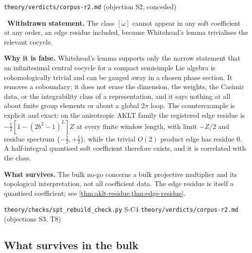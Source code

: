 %
{\texttt{theory/verdicts/corpus-r2.md} (objection S2, conceded)}

\begin{refutedclaim}\label{ref:spt-nogo}
\statusRefuted\ \textbf{Withdrawn statement.} The class $[\omega]$ cannot
appear in any soft coefficient at any order, an edge residue included, because
Whitehead's lemma trivialises the relevant cocycle.

\textbf{Why it is false.} Whitehead's lemma supports only the narrow
statement that an infinitesimal central cocycle for a compact semisimple Lie
algebra is cohomologically trivial and can be gauged away in a chosen phase
section. It removes a coboundary; it does not erase the dimension, the
weights, the Casimir data, or the integrability class of a representation, and
it says nothing at all about finite group elements or about a global
$2\pi$ loop. The counterexample is explicit and exact: on the anisotropic AKLT
family the registered edge residue is $-\tfrac12[1-(2b^{2}-1)^{L}]Z$ at every
finite window length, with limit $-Z/2$ and residue spectrum
$\{-\tfrac12,+\tfrac12\}$, while the trivial $O(2)$ product edge has residue
$0$. A half-integral quantised soft coefficient therefore exists, and it is
correlated with the class.

\textbf{What survives.} The bulk no-go concerns a bulk projective multiplier
and its topological interpretation, not all coefficient data. The edge residue
is itself a quantised coefficient; see \cref{thm:aklt-residue,thm:edge-residue}.
\end{refutedclaim}

%
{\texttt{theory/checks/spt\_rebuild\_check.py} S-C4}%
{\texttt{theory/verdicts/corpus-r2.md} (objections S3, T8)}

\subsection{What survives in the bulk}


